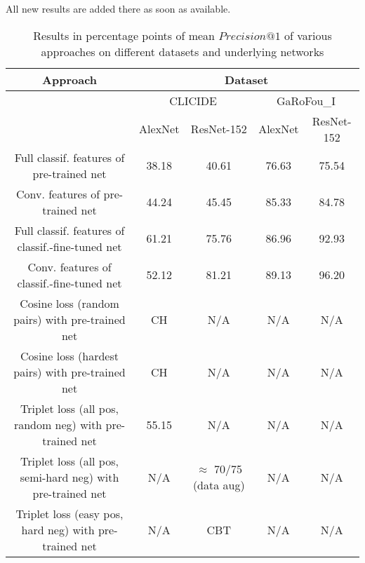 \documentclass[fleqn]{article}
\begin{document}
All new results are added there as soon as available.

\begin{table}
\begin{tabular}{|c|c|c||c|c|}
\hline
Approach & \multicolumn{4}{|c|}{Dataset}\\
\hline
& \multicolumn{2}{|c||}{CLICIDE} & \multicolumn{2}{|c|}{GaRoFou\_I}\\
\hline
& AlexNet & ResNet-152 & AlexNet & ResNet-152\\
\hline
Full classif. features of pre-trained net
& 38.18 & 40.61 & 76.63 & 75.54 \\
\hline
Conv. features of pre-trained net
& 44.24 & 45.45 & 85.33 & 84.78 \\
\hline
Full classif. features of classif.-fine-tuned net
& 61.21 & 75.76 & 86.96 & 92.93 \\
\hline
Conv. features of classif.-fine-tuned net
& 52.12 & 81.21 & 89.13 & 96.20 \\
\hline
Cosine loss (random pairs) with pre-trained net
& CH & N/A & N/A & N/A \\
\hline
Cosine loss (hardest pairs) with pre-trained net
& CH & N/A & N/A & N/A \\
\hline
Triplet loss (all pos, random neg) with pre-trained net
& 55.15 & N/A & N/A & N/A \\
\hline
Triplet loss (all pos, semi-hard neg) with pre-trained net
& N/A & $\approx$ 70/75 (data aug) & N/A & N/A \\
\hline
Triplet loss (easy pos, hard neg) with pre-trained net
& N/A & CBT & N/A & N/A \\
\hline
\end{tabular}
\caption{Results in percentage points of mean $Precision@1$ of various approaches on different datasets and underlying networks\label{tab:results}}
\end{table}
\end{document}
